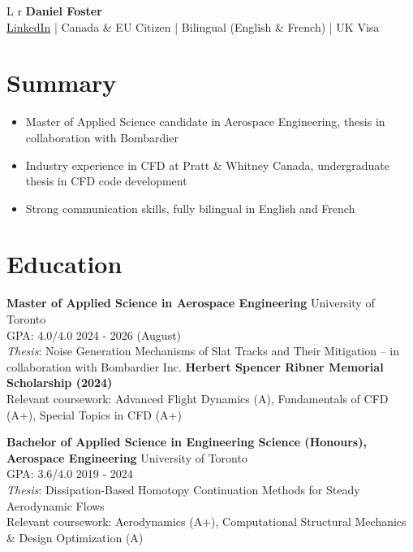 \documentclass[a4paper,11pt]{article}
\newcommand{\name}{Daniel Foster} %
\begin{document}
\selectfont
\parbox{2.35cm}{%


} \parbox{\dimexpr\linewidth\relax}{
    \begin{tabularx}{\linewidth}{L r}
  \textbf{\LARGE \name} \\
  {\href{https://www.linkedin.com/in/dnfost/}{LinkedIn} | Canada \& EU Citizen | Bilingual (English \& French) | UK Visa}\\
\end{tabularx}
\vspace{0.2cm}
}

\small

\section{Summary}
\begin{itemize}
    \itemsep0em 
    \item Master of Applied Science candidate in Aerospace Engineering, thesis in collaboration with Bombardier
    \item Industry experience in CFD at Pratt \& Whitney Canada, undergraduate thesis in CFD code development 
    \item Strong communication skills, fully bilingual in English and French
\end{itemize}

\section{Education}

    \textbf{Master of Applied Science in Aerospace Engineering}
    \hfill
    University of Toronto \\
    GPA: 4.0/4.0
    \hfill 
    2024 - 2026 (August) \\
    \textit{Thesis}: Noise Generation Mechanisms of Slat Tracks and Their Mitigation -- in collaboration with Bombardier Inc.
    \textbf{Herbert Spencer Ribner Memorial Scholarship (2024)} \\
    Relevant coursework: Advanced Flight Dynamics (A), Fundamentals of CFD (A+), Special Topics in CFD (A+)

    \vspace{\baselineskip}

    \textbf{Bachelor of Applied Science in Engineering Science (Honours), Aerospace Engineering}
    \hfill
    University of Toronto \\ 
    GPA: 3.6/4.0
    \hfill 
    2019 - 2024 \\
    \textit{Thesis}: Dissipation-Based Homotopy Continuation Methods for Steady Aerodynamic Flows \\
    Relevant coursework: Aerodynamics (A+), Computational Structural Mechanics \& Design Optimization (A)
\end{document}
